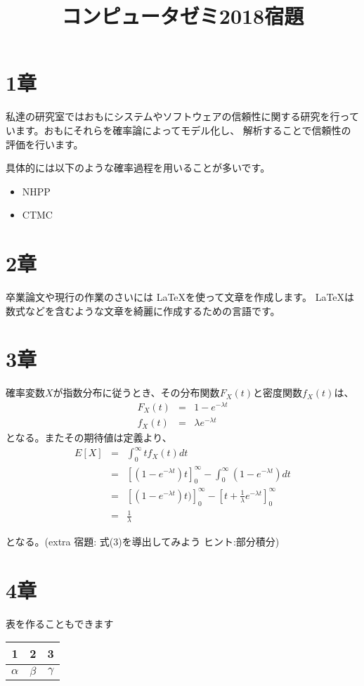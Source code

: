 \documentclass[a4paper,12pt]{article}
\begin{document}
\title{コンピュータゼミ2018宿題}
\date{}
\maketitle

\section{1章}
私達の研究室ではおもにシステムやソフトウェアの信頼性に関する研究を行っています。おもにそれらを確率論によってモデル化し、
解析することで信頼性の評価を行います。

具体的には以下のような確率過程を用いることが多いです。

\begin{itemize}
    \item NHPP
    \item CTMC
\end{itemize}


\section{2章}
卒業論文や現行の作業のさいには \LaTeX を使って文章を作成します。 \LaTeX は数式などを含むような文章を綺麗に作成するための言語です。

\section{3章}
確率変数$X$が指数分布に従うとき、その分布関数$F_X(t)$と密度関数$f_X(t)$は、
\begin{eqnarray}
F_X(t)&=&1-e^{-\lambda t}        \\
f_X(t)&=&\lambda e^{-\lambda t}
\end{eqnarray}
となる。またその期待値は定義より、
\begin{eqnarray}
E[X]&=&\int_0^{\infty}tf_X(t)dt  \nonumber\\
    &=&[(1-e^{-\lambda t})t]^\infty_0 - \int_0^{\infty}(1-e^{-\lambda t})dt   \nonumber\\
    &=&[(1-e^{-\lambda t})t)]^\infty_0 - [t + \frac{1}{\lambda}e^{-\lambda t}]^{\infty}_0  \nonumber\\
    &=&\frac{1}{\lambda}
\end{eqnarray}

となる。(extra 宿題: 式(3)を導出してみよう ヒント:部分積分)


\section{4章}
表を作ることもできます

\begin{table}[htb]
    \begin{center}
        \begin{tabular}{|c|c|c|}    \hline
            1 & 2 & 3  \\           \hline
            $\alpha$ & $\beta$ & $\gamma$ \\ \hline
        \end{tabular}
    \end{center}
\end{table}
        
\end{document}
